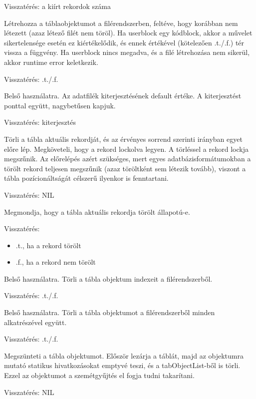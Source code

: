 Visszatérés: a kiírt rekordok száma

 

Létrehozza a táblaobjektumot a filérendszerben, feltéve, hogy
korábban nem létezett (azaz létező filét nem töröl). 
Ha userblock egy kódblock, akkor a művelet sikertelensége esetén
ez kiértékelődik, és ennek értékével (kötelezően .t./.f.) tér 
vissza a függvény. Ha userblock nincs megadva, és a filé
létrehozása nem sikerül, akkor runtime error keletkezik.

Visszatérés: .t./.f.
 

Belső használatra. 
Az adatfilék kiterjesztésének default értéke.
A kiterjesztést ponttal együtt, nagybetűsen kapjuk.

Visszatérés: kiterjesztés
 

Törli a tábla aktuális rekordját, és az érvényes sorrend szerinti
irányban egyet előre lép. Megköveteli, hogy a rekord lockolva
legyen. A törléssel a rekord lockja megszűnik. Az előrelépés azért
szükséges, mert egyes adatbázisformátumokban a törölt rekord 
teljesen megszűnik (azaz töröltként sem létezik tovább), 
viszont a tábla pozícionáltságát célszerű ilyenkor is fenntartani.

Visszatérés: NIL


Megmondja, hogy a tábla aktuális rekordja törölt állapotú-e.

Visszatérés:
\begin{itemize}
\item .t., ha a rekord törölt
\item .f., ha a rekord nem törölt 
\end{itemize}


Belső használatra. Törli a tábla objektum indexeit a filérendszerből.

Visszatérés: .t./.f.
 

Belső használatra. Törli a tábla objektumot a filérendszerből
minden alkatrészével együtt.

Visszatérés: .t./.f.


Megszünteti a tábla objektumot. Először lezárja a táblát,
majd az objektumra mutató statikus hivatkozásokat emptyvé teszi, 
és a tabObjectList-ből is törli. Ezzel az objektumot
a szemétgyűjtés el fogja tudni takarítani.

Visszatérés: NIL 


